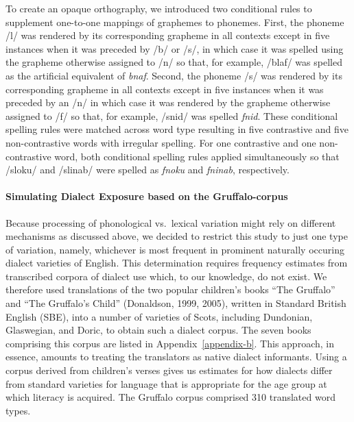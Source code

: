 \documentclass[doc,floatsintext]{apa6}
\let\oldparagraph\paragraph
\renewcommand{\paragraph}[1]{\oldparagraph{#1}\mbox{}}
\begin{document}
To create an opaque orthography, we introduced two conditional rules to
supplement one-to-one mappings of graphemes to phonemes. First, the
phoneme /l/ was rendered by its corresponding grapheme in all contexts
except in five instances when it was preceded by /b/ or /s/, in which
case it was spelled using the grapheme otherwise assigned to /n/ so
that, for example, /blaf/ was spelled as the artificial equivalent of
\emph{bnaf}. Second, the phoneme /s/ was rendered by its corresponding
grapheme in all contexts except in five instances when it was preceded
by an /n/ in which case it was rendered by the grapheme otherwise
assigned to /f/ so that, for example, /snid/ was spelled \emph{fnid}.
These conditional spelling rules were matched across word type resulting
in five contrastive and five non-contrastive words with irregular
spelling. For one contrastive and one non-contrastive word, both
conditional spelling rules applied simultaneously so that /sloku/ and
/slinab/ were spelled as \emph{fnoku} and \emph{fninab}, respectively.

\paragraph{Simulating Dialect Exposure based on the
Gruffalo-corpus}\label{simulating-dialect-exposure-based-on-the-gruffalo-corpus}

Because processing of phonological vs.~lexical variation might rely on
different mechanisms as discussed above, we decided to restrict this
study to just one type of variation, namely, whichever is most frequent
in prominent naturally occuring dialect varieties of English. This
determination requires frequency estimates from transcribed corpora of
dialect use which, to our knowledge, do not exist. We therefore used
translations of the two popular children's books \enquote{The Gruffalo}
and \enquote{The Gruffalo's Child} (Donaldson, 1999, 2005), written in
Standard British English (SBE), into a number of varieties of Scots,
including Dundonian, Glaswegian, and Doric, to obtain such a dialect
corpus. The seven books comprising this corpus are listed in
Appendix~\ref{appendix-b}. This approach, in essence, amounts to
treating the translators as native dialect informants. Using a corpus
derived from children's verses gives us estimates for how dialects
differ from standard varieties for language that is appropriate for the
age group at which literacy is acquired. The Gruffalo corpus comprised
310 translated word types.
\end{document}
